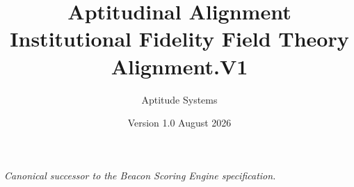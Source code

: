\documentclass[a4paper,11pt]{article}
\title{Aptitudinal Alignment\\Institutional Fidelity Field Theory\\[0.5em]{\large Alignment.V1}}
\author{Aptitude Systems}
\date{Version 1.0 \quad August 2026}
\begin{document}
\maketitle
\begin{center}
\textit{Canonical successor to the Beacon Scoring Engine specification.}
\end{center}
\tableofcontents
\newpage

















\end{document}
